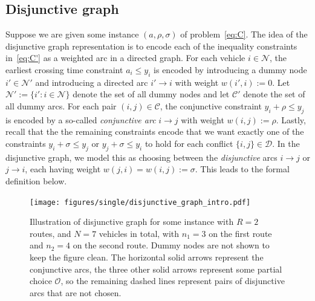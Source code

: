 \documentclass[a4paper]{report}
\theoremstyle{definition}
\theoremstyle{plain}
\begin{document}
\subsection{Disjunctive graph}

Suppose we are given some instance $(a, \rho, \sigma)$ of
problem~\eqref{eq:C}.
%
The idea of the disjunctive graph representation is to encode each of the
inequality constraints in~\eqref{eq:C'} as a weighted arc in a directed graph.
%
For each vehicle $i \in \mathcal{N}$, the earliest crossing time constraint
  $a_i \leq y_i$
is encoded by introducing a dummy node $i' \in \mathcal{N}'$ and introducing a
directed arc $i' \rightarrow i$ with weight $w(i', i) := 0$.
%
Let $\mathcal{N}' := \{ i' : i \in \mathcal{N}\}$ denote the set of all dummy
nodes and let $\mathcal{C}'$ denote the set of all dummy arcs.
%
For each pair $(i,j) \in \mathcal{C}$, the conjunctive constraint
  $y_i + \rho \leq y_j$
is encoded by a so-called \emph{conjunctive arc} $i \rightarrow j$ with weight
$w(i,j) := \rho$.
%
Lastly, recall that the the remaining constraints encode that we want exactly
one of the constraints $y_i + \sigma \leq y_j$ or $y_j + \sigma \leq y_i$ to
hold for each conflict $\{i,j\} \in \mathcal{D}$.
%
In the disjunctive graph, we model this as choosing between the
\emph{disjunctive} arcs $i \rightarrow j$ or $j \rightarrow i$, each having
weight $w(j,i) = w(i,j) := \sigma$.
%
This leads to the formal definition below.

\begin{figure}
  \centering
  \texttt{[image: figures/single/disjunctive\_graph\_intro.pdf]}
  \caption{Illustration of disjunctive graph for some instance with $R=2$
    routes, and $N=7$ vehicles in total, with $n_{1} = 3$ on the first route and
    $n_{2} = 4$ on the second route. Dummy nodes are not shown to keep the
    figure clean. The horizontal solid arrows represent the conjunctive arcs,
    the three other solid arrows represent some partial choice $\mathcal{O}$, so
    the remaining dashed lines represent pairs of disjunctive arcs that are not
    chosen.}\label{fig:disjunctive-graph-intro}
\end{figure}
\end{document}
